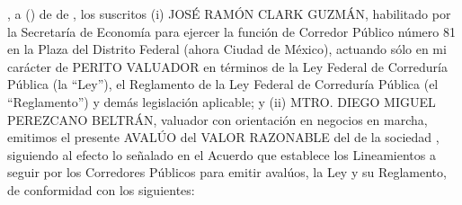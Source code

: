 \lugarInforme, a \diaInforme{} (\numberstringnum{\diainforme}) de \numberstringnum{\mesinforme}{} de \numberstringnum{\annoinforme}{}, los suscritos (i) JOSÉ RAMÓN CLARK GUZMÁN, habilitado por la Secretaría de Economía para ejercer la función de Corredor Público número 81 en la Plaza del Distrito Federal (ahora Ciudad de México), actuando sólo en mi carácter de PERITO VALUADOR en términos de la Ley Federal de Correduría Pública (la “Ley”), el Reglamento de la Ley Federal de Correduría Pública (el “Reglamento”) y demás legislación aplicable; y (ii) MTRO. DIEGO MIGUEL PEREZCANO BELTRÁN, valuador con orientación en negocios en marcha, emitimos el presente AVALÚO del VALOR RAZONABLE del \tipoAvaluo{} de la sociedad \bienesValuados, siguiendo al efecto lo señalado en el Acuerdo que establece los Lineamientos a seguir por los Corredores Públicos para emitir avalúos, la Ley y su Reglamento, de conformidad con los siguientes:



